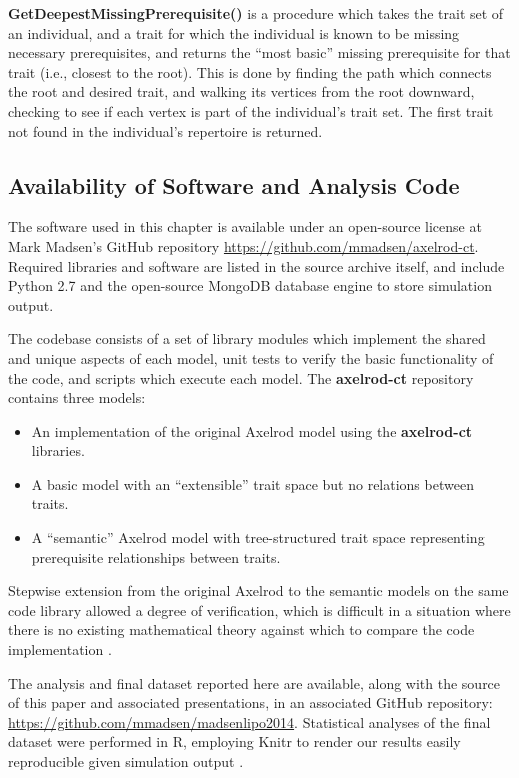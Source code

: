 \documentclass[referee,graybox,natbib]{svmult}
\begin{document}
\textbf{GetDeepestMissingPrerequisite()} is a procedure which takes the
trait set of an individual, and a trait for which the individual is
known to be missing necessary prerequisites, and returns the ``most
basic'' missing prerequisite for that trait (i.e., closest to the root).
This is done by finding the path which connects the root and desired
trait, and walking its vertices from the root downward, checking to see
if each vertex is part of the individual's trait set. The first trait
not found in the individual's repertoire is returned.

\subsection{Availability of Software and Analysis
Code}\label{availability-of-software-and-analysis-code}

The software used in this chapter is available under an open-source
license at Mark Madsen's GitHub repository
\url{https://github.com/mmadsen/axelrod-ct}. Required libraries and
software are listed in the source archive itself, and include Python 2.7
and the open-source MongoDB database engine to store simulation output.

The codebase consists of a set of library modules which implement the
shared and unique aspects of each model, unit tests to verify the basic
functionality of the code, and scripts which execute each model. The
\textbf{axelrod-ct} repository contains three models:

\begin{itemize}
\item
  An implementation of the original Axelrod model using the
  \textbf{axelrod-ct} libraries.
\item
  A basic model with an ``extensible'' trait space but no relations
  between traits.
\item
  A ``semantic'' Axelrod model with tree-structured trait space
  representing prerequisite relationships between traits.
\end{itemize}

Stepwise extension from the original Axelrod to the semantic models on
the same code library allowed a degree of verification, which is
difficult in a situation where there is no existing mathematical theory
against which to compare the code implementation
\citep{national2012Assessing}.

The analysis and final dataset reported here are available, along with
the source of this paper and associated presentations, in an associated
GitHub repository: \url{https://github.com/mmadsen/madsenlipo2014}.
Statistical analyses of the final dataset were performed in R, employing
Knitr to render our results easily reproducible given simulation output
\citep{xie2013dynamic}.





\end{document}

